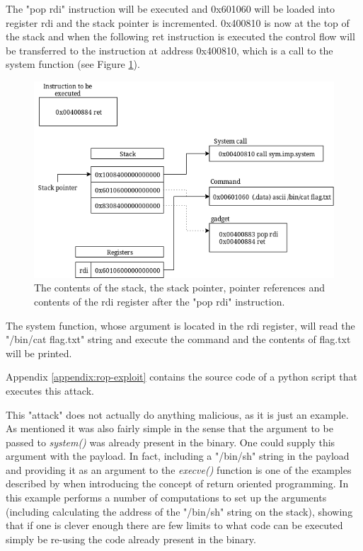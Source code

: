 The "pop rdi" instruction will be executed and 0x601060 will be loaded into register rdi
and the stack pointer is incremented. 0x400810 is now at the top of the stack and when the
following ret instruction is executed the control flow will be transferred to the
instruction at address 0x400810, which is a call to the system function (see Figure
\ref{fig:after-second}).

\begin{figure}[h]
	\centering
	\includegraphics[width=\textwidth]{background/software-diversity/figures/after-second}
	\caption{The contents of the stack, the stack pointer, pointer references and contents of the rdi register after the "pop rdi" instruction.}
	\label{fig:after-second}
\end{figure}

The system function, whose argument is located in the rdi register, will read the
"/bin/cat flag.txt" string and execute the command and the contents of flag.txt will be
printed.

Appendix \ref{appendix:rop-exploit} contains the source code of a python script that
executes this attack.

This "attack" does not actually do anything malicious, as it is just an example. As mentioned
it was also fairly simple in the sense that the argument to be passed to \textit{system()}
was already present in the binary. One could supply this argument with the payload. In
fact, including a "/bin/sh" string in the payload and providing it as an argument to the
\textit{execve()} function is one of the examples described by \textcite{rop} when
introducing the concept of return oriented programming. In this example \textcite{rop}
performs a number of computations to set up the arguments (including calculating the address
of the "/bin/sh" string on the stack), showing that if one is clever enough there are few
limits to what code can be executed simply be re-using the code already present in the binary.


